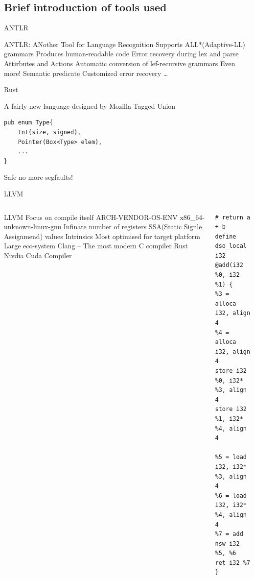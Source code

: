 \documentclass[aspectratio=1610]{ctexbeamer}
\begin{document}
\subsection{Brief introduction of tools used}
\begin{frame}{ANTLR}
    \begin{outline}
        \1 ANTLR: ANother Tool for Language Recognition
        \1 Supports ALL*(Adaptive-LL) grammars
            \2 Produces human-readable code
        \1 Error recovery during lex and parse
        \1 Attirbutes and Actions
        \1 Automatic conversion of lef-recursive grammars
        \1 Even more!
            \2 Semantic predicate
            \2 Customized error recovery
            \2 \dots
    \end{outline}
\end{frame}

\begin{frame}[fragile]{Rust}
    \begin{outline}
        \1 A fairly new language designed by Mozilla
        \1 Tagged Union
        \begin{verbatim}
pub enum Type{
    Int(size, signed),
    Pointer(Box<Type> elem),
    ...
}
        \end{verbatim}
        \1 Safe
            \2 no more segfaults!
    \end{outline}
\end{frame}

\begin{frame}[fragile]{LLVM}
    \begin{columns}
        \begin{column}{0.5\linewidth}
            \begin{outline}
                \1 LLVM
                \1  Focus on compile itself
                    \2 ARCH-VENDOR-OS-ENV
                        \3 x86_64-unknown-linux-gnu
                    \2 Infinate number of registers
                    \2 SSA(Static Signle Assignmend) values
                    \2 Intrinsics
                        \3 Most optimised for target platform
                \1 Large eco-system
                    \2 Clang -- The most modern C compiler
                    \2 Rust
                    \2 Nivdia Cuda Compiler
            \end{outline}
        \end{column}
        \begin{column}{0.5\linewidth}
            \begin{verbatim}
# return a + b
define dso_local i32 @add(i32 %0, i32 %1) {
%3 = alloca i32, align 4
%4 = alloca i32, align 4
store i32 %0, i32* %3, align 4
store i32 %1, i32* %4, align 4

%5 = load i32, i32* %3, align 4
%6 = load i32, i32* %4, align 4
%7 = add nsw i32 %5, %6
ret i32 %7
}
            \end{verbatim}
        \end{column}
    \end{columns}
\end{frame}
\end{document}
